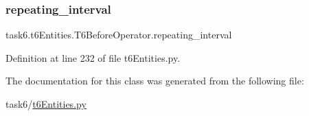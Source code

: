 \subsubsection{\texorpdfstring{repeating\+\_\+interval}{repeating\_interval}}
{\footnotesize\ttfamily task6.\+t6\+Entities.\+T6\+Before\+Operator.\+repeating\+\_\+interval}



Definition at line 232 of file t6\+Entities.\+py.



The documentation for this class was generated from the following file\+:\begin{DoxyCompactItemize}
\item 
task6/\hyperlink{t6Entities_8py}{t6\+Entities.\+py}\end{DoxyCompactItemize}
